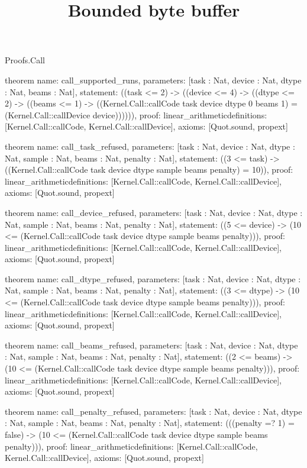 \begin{lexlean}{Proofs.Call}
\title{Bounded byte buffer}
\begin{semanticmodule}
theorem{
  name: call_supported_runs,
  parameters: [task : Nat, device : Nat, dtype : Nat, beams : Nat],
  statement: ((task <= 2) -> ((device <= 4) -> ((dtype <= 2) -> ((beams <= 1) -> ((Kernel.Call::callCode task device dtype 0 beams 1) = (Kernel.Call::callDevice device)))))),
  proof: linear_arithmetic{definitions: [Kernel.Call::callCode, Kernel.Call::callDevice]},
  axioms: [Quot.sound, propext]
}

theorem{
  name: call_task_refused,
  parameters: [task : Nat, device : Nat, dtype : Nat, sample : Nat, beams : Nat, penalty : Nat],
  statement: ((3 <= task) -> ((Kernel.Call::callCode task device dtype sample beams penalty) = 10)),
  proof: linear_arithmetic{definitions: [Kernel.Call::callCode, Kernel.Call::callDevice]},
  axioms: [Quot.sound, propext]
}

theorem{
  name: call_device_refused,
  parameters: [task : Nat, device : Nat, dtype : Nat, sample : Nat, beams : Nat, penalty : Nat],
  statement: ((5 <= device) -> (10 <= (Kernel.Call::callCode task device dtype sample beams penalty))),
  proof: linear_arithmetic{definitions: [Kernel.Call::callCode, Kernel.Call::callDevice]},
  axioms: [Quot.sound, propext]
}

theorem{
  name: call_dtype_refused,
  parameters: [task : Nat, device : Nat, dtype : Nat, sample : Nat, beams : Nat, penalty : Nat],
  statement: ((3 <= dtype) -> (10 <= (Kernel.Call::callCode task device dtype sample beams penalty))),
  proof: linear_arithmetic{definitions: [Kernel.Call::callCode, Kernel.Call::callDevice]},
  axioms: [Quot.sound, propext]
}

theorem{
  name: call_beams_refused,
  parameters: [task : Nat, device : Nat, dtype : Nat, sample : Nat, beams : Nat, penalty : Nat],
  statement: ((2 <= beams) -> (10 <= (Kernel.Call::callCode task device dtype sample beams penalty))),
  proof: linear_arithmetic{definitions: [Kernel.Call::callCode, Kernel.Call::callDevice]},
  axioms: [Quot.sound, propext]
}

theorem{
  name: call_penalty_refused,
  parameters: [task : Nat, device : Nat, dtype : Nat, sample : Nat, beams : Nat, penalty : Nat],
  statement: (((penalty =? 1) = false) -> (10 <= (Kernel.Call::callCode task device dtype sample beams penalty))),
  proof: linear_arithmetic{definitions: [Kernel.Call::callCode, Kernel.Call::callDevice]},
  axioms: [Quot.sound, propext]
}


\end{semanticmodule}
\end{lexlean}
